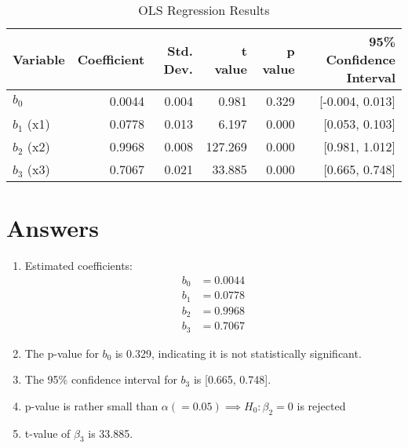 \documentclass[12pt]{article}
\begin{document}
\begin{table}[h!]
\centering
\caption{OLS Regression Results}
\label{tab:ols_results}
\begin{tabular}{lrrrrr}
\toprule
Variable & Coefficient & Std. Dev. & t value & p value & 95\% Confidence Interval \\
\midrule
\( b_0 \) & 0.0044 & 0.004 & 0.981 & 0.329 & [-0.004, 0.013] \\
\( b_1 \) (x1) & 0.0778 & 0.013 & 6.197 & 0.000 & [0.053, 0.103] \\
\( b_2 \) (x2) & 0.9968 & 0.008 & 127.269 & 0.000 & [0.981, 1.012] \\
\( b_3 \) (x3) & 0.7067 & 0.021 & 33.885 & 0.000 & [0.665, 0.748] \\
\bottomrule
\end{tabular}
\end{table}

\section{Answers}
\begin{enumerate}
    \item Estimated coefficients:
    \[
    \begin{aligned}
    b_0 &= 0.0044 \\
    b_1 &= 0.0778 \\
    b_2 &= 0.9968 \\
    b_3 &= 0.7067
    \end{aligned}
    \]

    \item The p-value for $b_0$  is 0.329, indicating it is not statistically significant.

    \item The 95\% confidence interval for $b_3$ is [0.665, 0.748].

    \item p-value is rather small than $\alpha(=0.05)  \implies H_0 : \beta_2 = 0 $ is rejected 

    \item t-value of $\beta_3$ is 33.885.

\end{enumerate}
\end{document}
